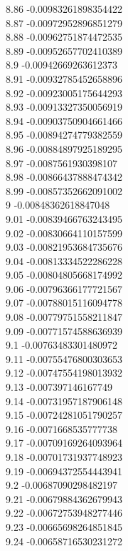{8.86	-0.00983261898354422\\
8.87	-0.00972952896851279\\
8.88	-0.00962751874472535\\
8.89	-0.00952657702410389\\
8.9	-0.00942669263612373\\
8.91	-0.00932785452658896\\
8.92	-0.00923005175644293\\
8.93	-0.00913327350056919\\
8.94	-0.00903750904661466\\
8.95	-0.00894274779382559\\
8.96	-0.00884897925189295\\
8.97	-0.0087561930398107\\
8.98	-0.00866437888474342\\
8.99	-0.00857352662091002\\
9	-0.00848362618847048\\
9.01	-0.00839466763243495\\
9.02	-0.00830664110157599\\
9.03	-0.00821953684735676\\
9.04	-0.00813334522286228\\
9.05	-0.00804805668174992\\
9.06	-0.00796366177721567\\
9.07	-0.00788015116094778\\
9.08	-0.00779751558211847\\
9.09	-0.00771574588636939\\
9.1	-0.00763483301480972\\
9.11	-0.00755476800303653\\
9.12	-0.00747554198013932\\
9.13	-0.007397146167749\\
9.14	-0.00731957187906148\\
9.15	-0.00724281051790257\\
9.16	-0.0071668535777738\\
9.17	-0.00709169264093964\\
9.18	-0.00701731937748923\\
9.19	-0.00694372554443941\\
9.2	-0.00687090298482197\\
9.21	-0.00679884362679943\\
9.22	-0.00672753948277446\\
9.23	-0.00665698264851845\\
9.24	-0.00658716530231272\\
}
